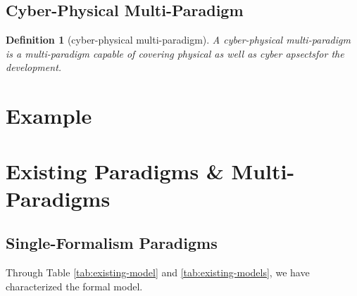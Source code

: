 \documentclass[a4paper,8pt]{article}
\newtheorem{definition}{\bf Definition}
\begin{document}
\subsection{Cyber-Physical Multi-Paradigm}

\begin{definition}[cyber-physical multi-paradigm]
A \emph{cyber-physical multi-paradigm} is a multi-paradigm capable of covering physical as well as cyber apsectsfor the development.
\end{definition}


\section{Example}


\section{Existing Paradigms \& Multi-Paradigms}

\subsection{Single-Formalism Paradigms}


Through Table \ref{tab:existing-model} and \ref{tab:existing-models}, we have characterized the formal model.	

	\newcommand{\HC}{\cellcolor[gray]{0.8}}
	
\end{document}
